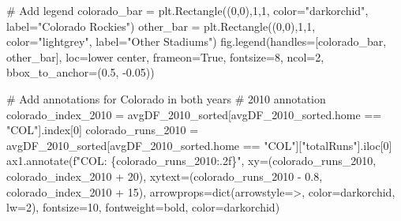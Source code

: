 \documentclass[
  letterpaper,
  DIV=11,
  numbers=noendperiod]{scrartcl}
\newenvironment{Shaded}{\begin{snugshade}}{\end{snugshade}}
\newcommand{\BuiltInTok}[1]{\textcolor[rgb]{0.00,0.23,0.31}{#1}}
\newcommand{\CommentTok}[1]{\textcolor[rgb]{0.37,0.37,0.37}{#1}}
\newcommand{\DecValTok}[1]{\textcolor[rgb]{0.68,0.00,0.00}{#1}}
\newcommand{\FloatTok}[1]{\textcolor[rgb]{0.68,0.00,0.00}{#1}}
\newcommand{\NormalTok}[1]{\textcolor[rgb]{0.00,0.23,0.31}{#1}}
\newcommand{\OperatorTok}[1]{\textcolor[rgb]{0.37,0.37,0.37}{#1}}
\newcommand{\SpecialCharTok}[1]{\textcolor[rgb]{0.37,0.37,0.37}{#1}}
\newcommand{\SpecialStringTok}[1]{\textcolor[rgb]{0.13,0.47,0.30}{#1}}
\newcommand{\StringTok}[1]{\textcolor[rgb]{0.13,0.47,0.30}{#1}}
\newcommand{\VariableTok}[1]{\textcolor[rgb]{0.07,0.07,0.07}{#1}}
\begin{document}
\begin{tcolorbox}
\begin{Shaded}
\begin{Highlighting}[]
       

\CommentTok{\# Add legend}
\NormalTok{colorado\_bar }\OperatorTok{=}\NormalTok{ plt.Rectangle((}\DecValTok{0}\NormalTok{,}\DecValTok{0}\NormalTok{),}\DecValTok{1}\NormalTok{,}\DecValTok{1}\NormalTok{, color}\OperatorTok{=}\StringTok{"darkorchid"}\NormalTok{, label}\OperatorTok{=}\StringTok{"Colorado Rockies"}\NormalTok{)}
\NormalTok{other\_bar }\OperatorTok{=}\NormalTok{ plt.Rectangle((}\DecValTok{0}\NormalTok{,}\DecValTok{0}\NormalTok{),}\DecValTok{1}\NormalTok{,}\DecValTok{1}\NormalTok{, color}\OperatorTok{=}\StringTok{"lightgrey"}\NormalTok{, label}\OperatorTok{=}\StringTok{"Other Stadiums"}\NormalTok{)}
\NormalTok{fig.legend(handles}\OperatorTok{=}\NormalTok{[colorado\_bar, other\_bar], loc}\OperatorTok{=}\StringTok{\textquotesingle{}lower center\textquotesingle{}}\NormalTok{, frameon}\OperatorTok{=}\VariableTok{True}\NormalTok{, fontsize}\OperatorTok{=}\DecValTok{8}\NormalTok{, ncol}\OperatorTok{=}\DecValTok{2}\NormalTok{, bbox\_to\_anchor}\OperatorTok{=}\NormalTok{(}\FloatTok{0.5}\NormalTok{, }\OperatorTok{{-}}\FloatTok{0.05}\NormalTok{))}

\CommentTok{\# Add annotations for Colorado in both years}
\CommentTok{\# 2010 annotation}
\NormalTok{colorado\_index\_2010 }\OperatorTok{=}\NormalTok{ avgDF\_2010\_sorted[avgDF\_2010\_sorted.home }\OperatorTok{==} \StringTok{"COL"}\NormalTok{].index[}\DecValTok{0}\NormalTok{]}
\NormalTok{colorado\_runs\_2010 }\OperatorTok{=}\NormalTok{ avgDF\_2010\_sorted[avgDF\_2010\_sorted.home }\OperatorTok{==} \StringTok{"COL"}\NormalTok{][}\StringTok{"totalRuns"}\NormalTok{].iloc[}\DecValTok{0}\NormalTok{]}
\NormalTok{ax1.annotate(}\SpecialStringTok{f"COL: }\SpecialCharTok{\{}\NormalTok{colorado\_runs\_2010}\SpecialCharTok{:.2f\}}\SpecialStringTok{"}\NormalTok{, }
\NormalTok{             xy}\OperatorTok{=}\NormalTok{(colorado\_runs\_2010, colorado\_index\_2010 }\OperatorTok{+} \DecValTok{20}\NormalTok{), }
\NormalTok{             xytext}\OperatorTok{=}\NormalTok{(colorado\_runs\_2010 }\OperatorTok{{-}} \FloatTok{0.8}\NormalTok{, colorado\_index\_2010 }\OperatorTok{+} \DecValTok{15}\NormalTok{),}
\NormalTok{             arrowprops}\OperatorTok{=}\BuiltInTok{dict}\NormalTok{(arrowstyle}\OperatorTok{=}\StringTok{\textquotesingle{}{-}\textgreater{}\textquotesingle{}}\NormalTok{, color}\OperatorTok{=}\StringTok{\textquotesingle{}darkorchid\textquotesingle{}}\NormalTok{, lw}\OperatorTok{=}\DecValTok{2}\NormalTok{),}
\NormalTok{             fontsize}\OperatorTok{=}\DecValTok{10}\NormalTok{, fontweight}\OperatorTok{=}\StringTok{\textquotesingle{}bold\textquotesingle{}}\NormalTok{, color}\OperatorTok{=}\StringTok{\textquotesingle{}darkorchid\textquotesingle{}}\NormalTok{)}


\end{Highlighting}
\end{Shaded}
\end{tcolorbox}
\end{document}
